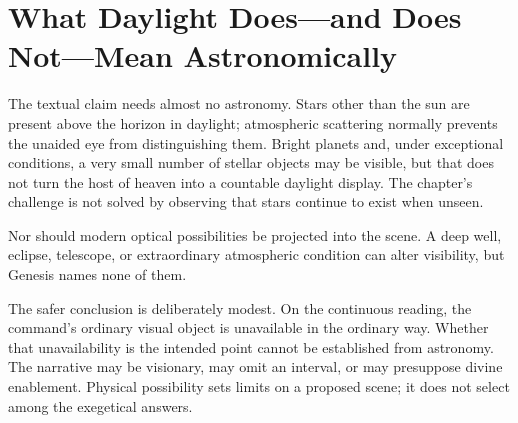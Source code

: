 \section{What Daylight Does---and Does Not---Mean Astronomically}

The textual claim needs almost no astronomy. Stars other than the sun are
present above the horizon in daylight; atmospheric scattering normally prevents
the unaided eye from distinguishing them. Bright planets and, under exceptional
conditions, a very small number of stellar objects may be visible, but that
does not turn the host of heaven into a countable daylight display. The
chapter's challenge is not solved by observing that stars continue to exist
when unseen.

Nor should modern optical possibilities be projected into the scene. A deep
well, eclipse, telescope, or extraordinary atmospheric condition can alter
visibility, but Genesis names none of them.

The safer conclusion is deliberately modest. On the continuous reading, the
command's ordinary visual object is unavailable in the ordinary way. Whether
that unavailability is the intended point cannot be established from astronomy.
The narrative may be visionary, may omit an interval, or may presuppose divine
enablement. Physical possibility sets limits on a proposed scene; it does not
select among the exegetical answers.

